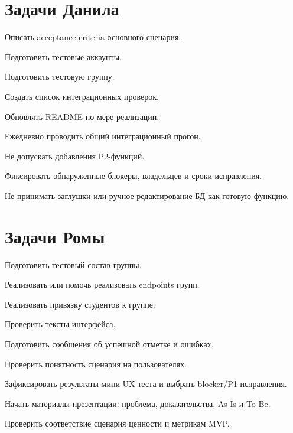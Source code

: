 \documentclass[11pt,a4paper]{article}
\begin{document}
\section{Задачи Данила}
\begin{tasklist}
  \item Описать acceptance criteria основного сценария.
  \item Подготовить тестовые аккаунты.
  \item Подготовить тестовую группу.
  \item Создать список интеграционных проверок.
  \item Обновлять README по мере реализации.
  \item Ежедневно проводить общий интеграционный прогон.
  \item Не допускать добавления P2-функций.
  \item Фиксировать обнаруженные блокеры, владельцев и сроки исправления.
  \item Не принимать заглушки или ручное редактирование БД как готовую функцию.
\end{tasklist}

\section{Задачи Ромы}
\begin{tasklist}
  \item Подготовить тестовый состав группы.
  \item Реализовать или помочь реализовать endpoints групп.
  \item Реализовать привязку студентов к группе.
  \item Проверить тексты интерфейса.
  \item Подготовить сообщения об успешной отметке и ошибках.
  \item Проверить понятность сценария на пользователях.
  \item Зафиксировать результаты мини-UX-теста и выбрать blocker/P1-исправления.
  \item Начать материалы презентации: проблема, доказательства, As Is и To Be.
  \item Проверить соответствие сценария ценности и метрикам MVP.
\end{tasklist}
\end{document}
